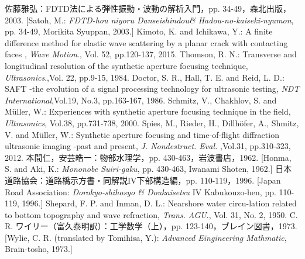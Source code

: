 \documentclass{jjsce}
\begin{document}
\begin{thebibliography}{9}
	佐藤雅弘：FDTD法による弾性振動・波動の解析入門，pp. 34-49，森北出版，2003. 
	[Satoh, M.: \textit{FDTD-hou niyoru Danseishindou\& Hadou-no-kaiseki-nyumon}, pp. 34-49, Morikita Syuppan, 2003.]
	Kimoto, K. and Ichikawa, Y.:
	A finite difference method for elastic wave scattering by a planar crack with contacting faces
	, \textit{Wave Motion}., Vol. 52, pp.120-137, 2015.
	Thomson, R. N.:
	Transverse and longitudinal resolution of the synthetic aperture focusing technique,
	\textit{Ultrasonics}.,Vol. 22, pp.9-15, 1984. 
	Doctor, S. R., Hall, T. E. and Reid, L. D.:
	SAFT -the evolution of a signal processing technology for ultrasonic testing,
	\textit{ NDT International},Vol.19, No.3, pp.163-167, 1986. 
	Schmitz, V.,  Chakhlov, S. and M\"{u}ller, W.:
	Experiences with synthetic aperture focusing technique in the field,
	\textit{ Ultrasonics}, Vol.38, pp.731-738, 2000.
	Spies, M., Rieder, H., Dillh\"{o}fer, A.,  Shmitz, V. and M\"{u}ller, W.:
	Synthetic aperture focusing and time-of-flight diffraction 
	ultrasonic imaging -past and present,
	\textit{ J. Nondestruct. Eval. },Vol.31, pp.310-323, 2012.
	本間仁，安芸皓一：物部水理学，pp. 430-463，岩波書店，1962. 
	[Honma, S. and Aki, K.: \textit{Mononobe Suiri-gaku}, pp. 430-463, Iwanami Shoten, 1962.]
	日本道路協会：道路橋示方書・同解説IV下部構造編，pp. 110-119，1996. 
	[Japan Road Association: \textit{Dorokyo-shihosyo \& Doukaisetsu} IV Kabukouzo-hen, pp. 110-119, 1996.]
	Shepard, F. P. and Inman, D. L.: Nearshore water circu-lation related to bottom topography and wave refraction, 
	\textit{Trans. AGU}., Vol. 31, No. 2, 1950.
	C. R. ワイリー（富久泰明訳）：工学数学（上），pp. 123-140，ブレイン図書，1973. 
	[Wylie, C. R. (translated by Tomihisa, Y.): \textit{Advanced Eingineering Mathmatic}, Brain-tosho, 1973.]
\end{thebibliography}
\end{document}

